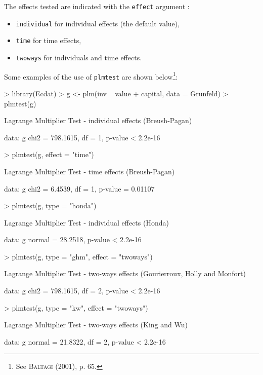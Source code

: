 \documentclass{article}
\begin{document}
The effects tested are indicated with the  \texttt{effect} argument :

\begin{itemize}
\item \texttt{individual} for individual effects  (the default value),
\item \texttt{time} for time effects,
\item \texttt{twoways} for individuals and time effects.
\end{itemize}

Some examples of the use of \texttt{plmtest} are shown below\footnote{See \textsc{Baltagi} (2001), p. 65.}:

\begin{Schunk}
\begin{Sinput}
> library(Ecdat)
> g <- plm(inv ~ value + capital, data = Grunfeld)
> plmtest(g)
\end{Sinput}
\begin{Soutput}
	Lagrange Multiplier Test - individual effects (Breush-Pagan)

data:  g 
chi2 = 798.1615, df = 1, p-value < 2.2e-16
\end{Soutput}
\begin{Sinput}
> plmtest(g, effect = "time")
\end{Sinput}
\begin{Soutput}
	Lagrange Multiplier Test - time effects (Breush-Pagan)

data:  g 
chi2 = 6.4539, df = 1, p-value = 0.01107
\end{Soutput}
\begin{Sinput}
> plmtest(g, type = "honda")
\end{Sinput}
\begin{Soutput}
	Lagrange Multiplier Test - individual effects (Honda)

data:  g 
normal = 28.2518, p-value < 2.2e-16
\end{Soutput}
\begin{Sinput}
> plmtest(g, type = "ghm", effect = "twoways")
\end{Sinput}
\begin{Soutput}
	Lagrange Multiplier Test - two-ways effects (Gourierroux, Holly and
	Monfort)

data:  g 
chi2 = 798.1615, df = 2, p-value < 2.2e-16
\end{Soutput}
\begin{Sinput}
> plmtest(g, type = "kw", effect = "twoways")
\end{Sinput}
\begin{Soutput}
	Lagrange Multiplier Test - two-ways effects (King and Wu)

data:  g 
normal = 21.8322, df = 2, p-value < 2.2e-16
\end{Soutput}
\end{Schunk}
\end{document}
